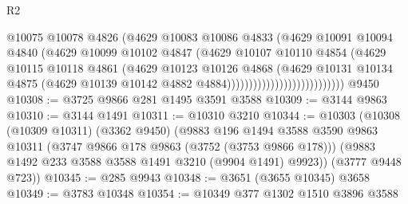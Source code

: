 \begin{lexlean}{R2}
\begin{coremodule}
                                          @10075
                                          @10078
                                          @4826
                                          (@4629
                                            @10083
                                            @10086
                                            @4833
                                            (@4629
                                              @10091
                                              @10094
                                              @4840
                                              (@4629
                                                @10099
                                                @10102
                                                @4847
                                                (@4629
                                                  @10107
                                                  @10110
                                                  @4854
                                                  (@4629
                                                    @10115
                                                    @10118
                                                    @4861
                                                    (@4629
                                                      @10123
                                                      @10126
                                                      @4868
                                                      (@4629
                                                        @10131
                                                        @10134
                                                        @4875
                                                        (@4629
                                                          @10139
                                                          @10142
                                                          @4882
                                                          @4884)))))))))))))))))))))))))))
    @9450
@10308 := @3725 @9866 @281 @1495 @3591 @3588
@10309 := @3144 @9863
@10310 := @3144 @1491
@10311 := @10310 @3210
@10344 := @10303
    (@10308
      (@10309 @10311)
      (@3362 @9450)
      (@9883
        @196
        @1494
        @3588
        @3590
        @9863
        @10311
        (@3747 @9866 @178 @9863 (@3752 (@3753 @9866 @178)))
        (@9883 @1492 @233 @3588 @3588 @1491 @3210 (@9904 @1491) @9923))
      (@3777 @9448 @723))
@10345 := @285 @9943
@10348 := @3651 (@3655 @10345) @3658
@10349 := @3783 @10348
@10354 := @10349 @377 @1302 @1510 @3896 @3588

\end{coremodule}
\end{lexlean}
